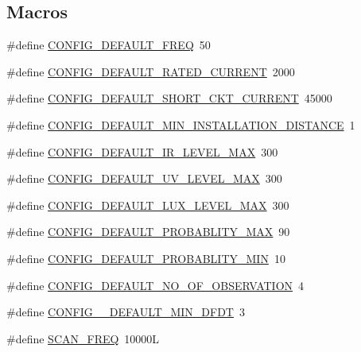 \subsection*{Macros}
\begin{DoxyCompactItemize}
\item 
\#define \hyperlink{a00086_a985a153b3edd3d7d638137ae0b9e5e67}{C\+O\+N\+F\+I\+G\+\_\+\+D\+E\+F\+A\+U\+L\+T\+\_\+\+F\+R\+E\+Q}~50
\item 
\#define \hyperlink{a00086_ae329eb408f386777cbb443c27ca7c1c5}{C\+O\+N\+F\+I\+G\+\_\+\+D\+E\+F\+A\+U\+L\+T\+\_\+\+R\+A\+T\+E\+D\+\_\+\+C\+U\+R\+R\+E\+N\+T}~2000
\item 
\#define \hyperlink{a00086_a9b142f2e7d26511af74c411c0e524384}{C\+O\+N\+F\+I\+G\+\_\+\+D\+E\+F\+A\+U\+L\+T\+\_\+\+S\+H\+O\+R\+T\+\_\+\+C\+K\+T\+\_\+\+C\+U\+R\+R\+E\+N\+T}~45000
\item 
\#define \hyperlink{a00086_aad4ef21bb535ed8bbba5a4f2d0451711}{C\+O\+N\+F\+I\+G\+\_\+\+D\+E\+F\+A\+U\+L\+T\+\_\+\+M\+I\+N\+\_\+\+I\+N\+S\+T\+A\+L\+L\+A\+T\+I\+O\+N\+\_\+\+D\+I\+S\+T\+A\+N\+C\+E}~1
\item 
\#define \hyperlink{a00086_adf882de105367de21f0cbfe4490a046f}{C\+O\+N\+F\+I\+G\+\_\+\+D\+E\+F\+A\+U\+L\+T\+\_\+\+I\+R\+\_\+\+L\+E\+V\+E\+L\+\_\+\+M\+A\+X}~300
\item 
\#define \hyperlink{a00086_a29f761c18bae89d087200e4f1891c651}{C\+O\+N\+F\+I\+G\+\_\+\+D\+E\+F\+A\+U\+L\+T\+\_\+\+U\+V\+\_\+\+L\+E\+V\+E\+L\+\_\+\+M\+A\+X}~300
\item 
\#define \hyperlink{a00086_a04ab25767fbb61ec61784da889ec8c09}{C\+O\+N\+F\+I\+G\+\_\+\+D\+E\+F\+A\+U\+L\+T\+\_\+\+L\+U\+X\+\_\+\+L\+E\+V\+E\+L\+\_\+\+M\+A\+X}~300
\item 
\#define \hyperlink{a00086_a96cf926b530a1d5968881620d2f10445}{C\+O\+N\+F\+I\+G\+\_\+\+D\+E\+F\+A\+U\+L\+T\+\_\+\+P\+R\+O\+B\+A\+B\+L\+I\+T\+Y\+\_\+\+M\+A\+X}~90
\item 
\#define \hyperlink{a00086_a599be42d4b357badb7c9b16a124a186a}{C\+O\+N\+F\+I\+G\+\_\+\+D\+E\+F\+A\+U\+L\+T\+\_\+\+P\+R\+O\+B\+A\+B\+L\+I\+T\+Y\+\_\+\+M\+I\+N}~10
\item 
\#define \hyperlink{a00086_af69b35a9f07bfcfe500538565d898c65}{C\+O\+N\+F\+I\+G\+\_\+\+D\+E\+F\+A\+U\+L\+T\+\_\+\+N\+O\+\_\+\+O\+F\+\_\+\+O\+B\+S\+E\+R\+V\+A\+T\+I\+O\+N}~4
\item 
\#define \hyperlink{a00086_a0eae7c540b766617bb00f79cd63415a2}{C\+O\+N\+F\+I\+G\+\_\+\+\_\+\+D\+E\+F\+A\+U\+L\+T\+\_\+\+M\+I\+N\+\_\+\+D\+F\+D\+T}~3
\item 
\#define \hyperlink{a00086_a8127170b687c1f67a968886c128e76e4}{S\+C\+A\+N\+\_\+\+F\+R\+E\+Q}~10000\+L

\end{DoxyCompactItemize}
